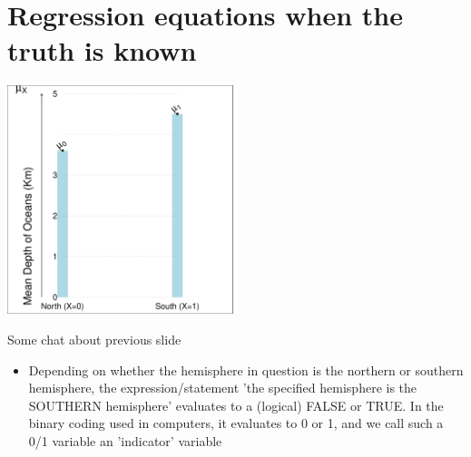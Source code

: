 \documentclass[10pt]{beamer}\usepackage[]{graphicx}\usepackage[]{color}
\newenvironment{knitrout}{}{} %
\begin{document}
\section{Regression equations when the truth is known}

\begin{frame}
\end{frame}


\begin{frame}

	
\begin{knitrout}\tiny
{}\color{fgcolor}

\includegraphics[width=0.5\textwidth]{figure/unnamed-chunk-2-1} \hfill{}



\end{knitrout}
\end{frame}


\begin{frame}{Some chat about previous slide}
	\begin{itemize}
		\item Depending on whether the hemisphere in question is the northern or southern hemisphere, the expression/statement 'the specified hemisphere is the SOUTHERN hemisphere' evaluates to a (logical) FALSE or TRUE. In the binary coding used in computers, it evaluates to 0 or 1, and we call such a 0/1 variable an 'indicator' variable
	\end{itemize}
\end{frame}
\end{document}
